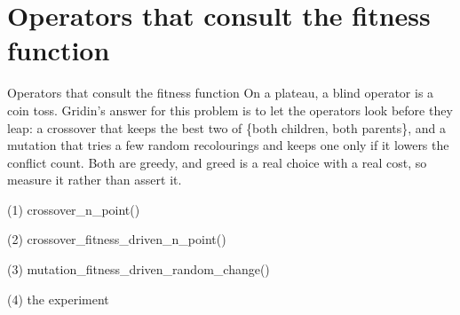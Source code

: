 \section{Operators that consult the fitness function}

\begin{frame}{Operators that consult the fitness function}
On a plateau, a blind operator is a coin toss. Gridin's answer for this problem
is to let the operators look before they leap: a crossover that keeps the best
two of \{both children, both parents\}, and a mutation that tries a few random
recolourings and keeps one only if it lowers the conflict count. Both are
greedy, and greed is a real choice with a real cost, so measure it rather than
assert it.
\end{frame}

\begin{frame}[fragile]{(1) crossover\_n\_point()}

\end{frame}

\begin{frame}[fragile]{(2) crossover\_fitness\_driven\_n\_point()}

\end{frame}

\begin{frame}[fragile]{(3) mutation\_fitness\_driven\_random\_change()}

\end{frame}

\begin{frame}[fragile]{(4) the experiment}

\end{frame}


